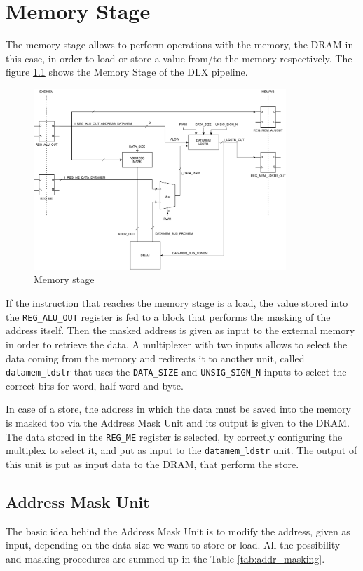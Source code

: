 \chapter{Memory Stage}
\label{chp:memory_stage}
The memory stage allows to perform operations with the memory, the DRAM in this case, in order to load or store a value from/to the memory respectively. The figure \ref{fig:mem_stage} shows the Memory Stage of the DLX pipeline.

\begin{figure}[H]   
	\centering
	\includegraphics[width=0.85\textwidth]{chapters/6_MemoryStage/images/mem_stage.pdf}
	\caption{Memory stage}
	\label{fig:mem_stage}
\end{figure}

If the instruction that reaches the memory stage is a load, the value stored into the \texttt{REG\_ALU\_OUT} register is fed to a block that performs the masking of the address itself. Then the masked address is given as input to the external memory in order to retrieve the data. A multiplexer with two inputs allows to select the data coming from the memory and redirects it to another unit, called \texttt{datamem\_ldstr} that uses the \texttt{DATA\_SIZE} and \texttt{UNSIG\_SIGN\_N} inputs to select the correct bits for word, half word and byte.

In case of a store, the address in which the data must be saved into the memory is masked too via the Address Mask Unit and its output is given to the DRAM. The data stored in the \texttt{REG\_ME} register is selected, by correctly configuring the multiplex to select it, and put as input to the \texttt{datamem\_ldstr} unit. The output of this unit is put as input data to the DRAM, that perform the store.

\section{Address Mask Unit}
The basic idea behind the Address Mask Unit is to modify the address, given as input, depending on the data size we want to store or load. All the possibility and masking procedures are summed up in the Table \ref{tab:addr_masking}. 

